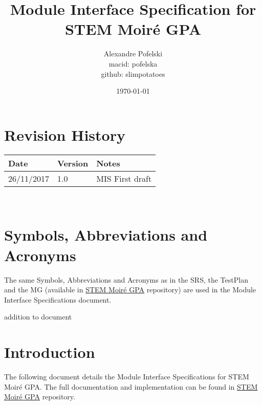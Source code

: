 \documentclass[12pt, titlepage]{article}
\newcommand{\progname}{STEM Moir{\'e} GPA}
\begin{document}
\title{Module Interface Specification for \progname{}}

\author{Alexandre Pofelski \\
		macid: pofelska \\
		github: slimpotatoes}

\date{\today}

\maketitle


\section{Revision History}

\begin{tabularx}{\textwidth}{p{3cm}p{2cm}X}
\toprule {\bf Date} & {\bf Version} & {\bf Notes}\\
\midrule
26/11/2017 & 1.0 & MIS First draft \\
\bottomrule
\end{tabularx}

~\newpage

\section{Symbols, Abbreviations and Acronyms}

The same Symbols, Abbreviations and Acronyms as in the SRS, the TestPlan and the MG (available in \href{https://github.com/slimpotatoes/STEM_Moire_GPA}{\progname{}} repository) are used in the Module Interface Specifications document. 

addition to document


\newpage

\tableofcontents

\newpage


\section{Introduction}

The following document details the Module Interface Specifications for \progname{}. The full documentation and implementation can be found in \href{https://github.com/slimpotatoes/STEM_Moire_GPA}{\progname{}} repository.
\end{document}
